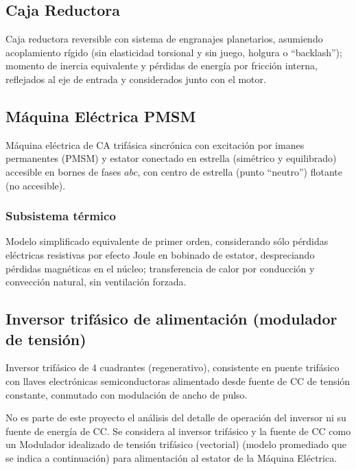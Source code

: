 \documentclass[a4paper, 10pt, onecolumn,journal]{ieeeconf}
\begin{document}
\subsection{\textbf{Caja Reductora}}
Caja reductora reversible con sistema de engranajes planetarios, asumiendo acoplamiento rígido (sin elasticidad torsional y sin juego, holgura o ``backlash''); momento de inercia equivalente y pérdidas de energía por fricción interna, reflejados al eje de entrada y considerados junto con el motor.

\subsection{\textbf{Máquina Eléctrica PMSM}}
Máquina eléctrica de CA trifásica sincrónica con excitación por imanes permanentes (PMSM) y estator conectado en estrella (simétrico y equilibrado) accesible en bornes de fases $abc$, con centro de estrella (punto “neutro”) flotante (no accesible).

\vspace*{0.1cm}
\subsubsection{\textbf{Subsistema térmico}} Modelo simplificado equivalente de primer orden, considerando sólo pérdidas
eléctricas resistivas por efecto Joule en bobinado de estator, despreciando pérdidas magnéticas
en el núcleo; transferencia de calor por conducción y convección natural, sin ventilación forzada.

\subsection{\textbf{Inversor trifásico de alimentación (modulador de tensión)}}

Inversor trifásico de 4 cuadrantes (regenerativo), consistente en puente trifásico con llaves electrónicas semiconductoras alimentado desde fuente de CC de tensión constante, conmutado con modulación de ancho de pulso.

No es parte de este proyecto el análisis del detalle de operación del inversor ni su fuente de energía de CC. Se considera al inversor trifásico y la fuente de CC como un Modulador idealizado de tensión trifásico (vectorial) (modelo promediado que se indica a continuación) para alimentación al estator de la Máquina Eléctrica.
\vspace*{0.1cm}
\end{document}
